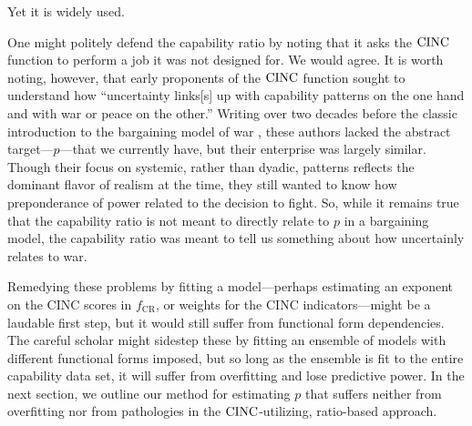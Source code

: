 Yet it is widely used.  

One might politely defend the capability ratio by noting that it asks the $\operatorname{CINC}$ function to perform a job it was not designed for.  We would agree.  It is worth noting, however, that early proponents of the $\operatorname{CINC}$ function \citep[24]{singer1972} sought to understand how ``uncertainty links[s] up with capability patterns on the one hand and with war or peace on the other.''  Writing over two decades before the classic introduction to the bargaining model of war \citep{fearon1995}, these authors lacked the abstract target---$p$---that we currently have, but their enterprise was largely similar.  Though their focus on systemic, rather than dyadic, patterns reflects the dominant flavor of realism at the time, they still wanted to know how preponderance of power related to the decision to fight.  So, while it remains true that the capability ratio is not meant to directly relate to $p$ in a bargaining model, the capability ratio was meant to tell us something about how uncertainly relates to war.

Remedying these problems by fitting a model---perhaps estimating an exponent on the CINC scores in $f_{\text{CR}}$, or weights for the CINC indicators---might be a laudable first step, but it would still suffer from functional form dependencies.  The careful scholar might sidestep these by fitting an ensemble of models with different functional forms imposed, but so long as the ensemble is fit to the entire capability data set, it will suffer from overfitting and lose predictive power.  In the next section, we outline our method for estimating $p$ that suffers neither from overfitting nor from pathologies in the $\operatorname{CINC}$-utilizing, ratio-based approach. 